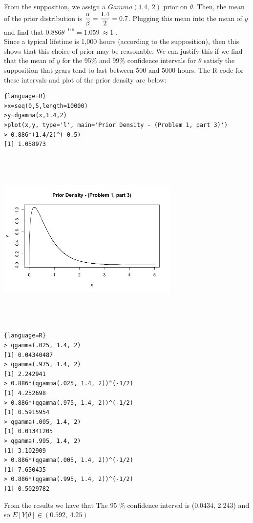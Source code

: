 \documentclass[10pt,a4paper]{article}
\begin{document}
From the supposition, we assign a $Gamma(1.4, \ 2)$ prior on $\theta$. Then, the mean of the prior distribution is $\mathlarger{\frac{\alpha}{\beta}=\frac{1.4}{2}=0.7}$. Plugging this mean into the mean of $y$ and find that $0.886\theta^{-0.5}=1.059 \ \approx 1$ .\\
Since a typical lifetime is 1,000 hours (according to the supposition), then this shows that this choice of prior may be reasonable. We can justify this if we find that the mean of $y$ for the 95\% and 99\% confidence intervals for $\theta$ satisfy the supposition that gears tend to last between 500 and 5000 hours. The R code for these intervals and plot of the prior density are below:\\
\begin{lstlisting}{language=R}
>x=seq(0,5,length=10000)
>y=dgamma(x,1.4,2)
>plot(x,y, type='l', main='Prior Density - (Problem 1, part 3)')
> 0.886*(1.4/2)^(-0.5)
[1] 1.058973
\end{lstlisting}
\includegraphics[width=9cm,height=9cm,keepaspectratio]{prob1part3}\\
\begin{lstlisting}{language=R}
> qgamma(.025, 1.4, 2)
[1] 0.04340487
> qgamma(.975, 1.4, 2)
[1] 2.242941
> 0.886*(qgamma(.025, 1.4, 2))^(-1/2)
[1] 4.252698
> 0.886*(qgamma(.975, 1.4, 2))^(-1/2)
[1] 0.5915954
> qgamma(.005, 1.4, 2)
[1] 0.01341205
> qgamma(.995, 1.4, 2)
[1] 3.102909
> 0.886*(qgamma(.005, 1.4, 2))^(-1/2)
[1] 7.650435
> 0.886*(qgamma(.995, 1.4, 2))^(-1/2)
[1] 0.5029782
\end{lstlisting}
From the results we have that
The 95 \% confidence interval is (0.0434, 2.243) and so $E[Y|\theta ] \in (0.592,\ 4.25)$\\
\end{document}
